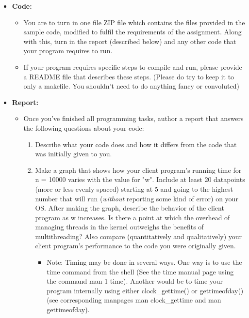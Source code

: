 \documentclass[12pt]{extarticle}
\begin{document}
\begin{itemize}
    \setlength\itemsep{-0.1em}

    \item \textbf{Code:}
    \begin{itemize}
        \setlength\itemsep{-0.1em}
        
        \item You are to turn in one file ZIP file which contains the files provided in the sample code, modified to fulfil the requirements of the assignment.  Along with this, turn in the report (described below) and any other code that your program requires to run.  
        \item If your program requires specific steps to compile and run, please provide a README file that describes these steps.  (Please do try to keep it to only a makefile.  You shouldn't need to do anything fancy or convoluted)
        
    \end{itemize}

    \item \textbf{Report:}
    \begin{itemize}
        \setlength\itemsep{-0.1em}
        
        \item Once you've finished all programming tasks, author a report that answers the following questions about your code:
        \begin{enumerate}
        
            \item Describe what your code does and how it differs from the code that was initially given to you.  
            \item Make a graph that shows how your client program's running time for n = 10000 varies with the value for "w".  Include at least 20 datapoints (more or less evenly spaced) starting at 5 and going to the highest number that will run (\emph{without} reporting some kind of error) on your OS.  After making the graph, describe the behavior of the client program as w increases.  Is there a point at which the overhead of managing threads in the kernel outweighs the benefits of multithreading?  Also compare (quantitatively and qualitatively) your client program's performance to the code you were originally given.
            \begin{itemize}
                \setlength\itemsep{-0.1em}
                
                \item Note: Timing may be done in several ways.  One way is to use the time command from the shell (See the time manual page using the command man 1 time).  Another would be to time your program internally using either clock\_gettime() or gettimeofday() (see corresponding manpages man clock\_gettime and man gettimeofday). 
                

\end{itemize}
\end{enumerate}
\end{itemize}
\end{itemize}
\end{document}

